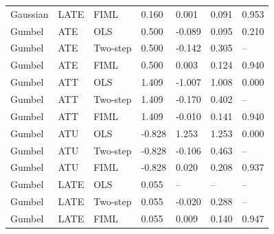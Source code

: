 \begin{table}[htbp]
\begin{tabular}{lllllll}
Gaussian & LATE & FIML & 0.160 & 0.001 & 0.091 & 0.953 \\
Gumbel & ATE & OLS & 0.500 & -0.089 & 0.095 & 0.210 \\
Gumbel & ATE & Two-step & 0.500 & -0.142 & 0.305 & -- \\
Gumbel & ATE & FIML & 0.500 & 0.003 & 0.124 & 0.940 \\
Gumbel & ATT & OLS & 1.409 & -1.007 & 1.008 & 0.000 \\
Gumbel & ATT & Two-step & 1.409 & -0.170 & 0.402 & -- \\
Gumbel & ATT & FIML & 1.409 & -0.010 & 0.141 & 0.940 \\
Gumbel & ATU & OLS & -0.828 & 1.253 & 1.253 & 0.000 \\
Gumbel & ATU & Two-step & -0.828 & -0.106 & 0.463 & -- \\
Gumbel & ATU & FIML & -0.828 & 0.020 & 0.208 & 0.937 \\
Gumbel & LATE & OLS & 0.055 & -- & -- & -- \\
Gumbel & LATE & Two-step & 0.055 & -0.020 & 0.288 & -- \\
Gumbel & LATE & FIML & 0.055 & 0.009 & 0.140 & 0.947 \\
\hline\end{tabular}\end{table}
